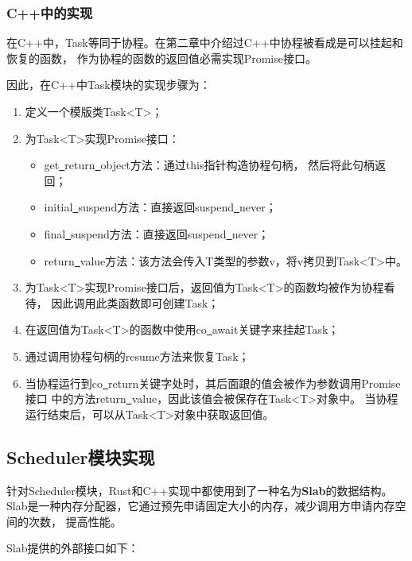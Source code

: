 \documentclass[supercite]{HustGraduPaper}
\theoremstyle{definition}
\begin{document}
\subsubsection{C++中的实现}

在C++中，Task等同于协程。在第二章中介绍过C++中协程被看成是可以挂起和恢复的函数，
作为协程的函数的返回值必需实现Promise接口。\par

因此，在C++中Task模块的实现步骤为：

\begin{enumerate}
  \item 定义一个模版类Task<T>；
  \item 为Task<T>实现Promise接口：
    \begin{itemize}
      \item get\underline{~}return\underline{~}object方法：通过this指针构造协程句柄，
        然后将此句柄返回；
      \item initial\underline{~}suspend方法：直接返回suspend\underline{~}never；
      \item final\underline{~}suspend方法：直接返回suspend\underline{~}never；
      \item return\underline{~}value方法：该方法会传入T类型的参数v，将v拷贝到Task<T>中。
    \end{itemize}
  \item 为Task<T>实现Promise接口后，返回值为Task<T>的函数均被作为协程看待，
    因此调用此类函数即可创建Task；
  \item 在返回值为Task<T>的函数中使用co\underline{~}await关键字来挂起Task；
  \item 通过调用协程句柄的resume方法来恢复Task；
  \item 当协程运行到co\underline{~}return关键字处时，其后面跟的值会被作为参数调用Promise接口
    中的方法return\underline{~}value，因此该值会被保存在Task<T>对象中。
    当协程运行结束后，可以从Task<T>对象中获取返回值。
\end{enumerate}

\subsection{Scheduler模块实现}

针对Scheduler模块，Rust和C++实现中都使用到了一种名为\textbf{Slab}的数据结构。
Slab是一种内存分配器，它通过预先申请固定大小的内存，减少调用方申请内存空间的次数，
提高性能。\par

Slab提供的外部接口如下：
\end{document}

